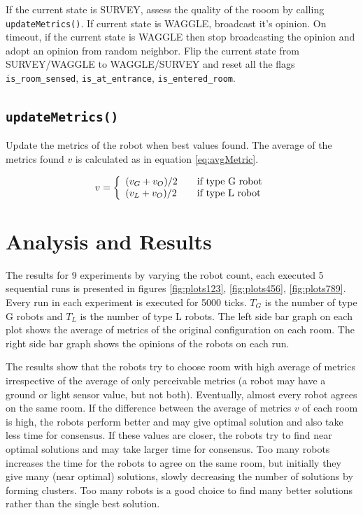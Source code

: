 \documentclass{llncs}
\begin{document}
	If the current state is SURVEY, assess the quality of the rooom by calling \texttt{updateMetrics()}. If current state is WAGGLE, broadcast it's opinion. On timeout, if the current state is WAGGLE then stop broadcasting the opinion and adopt an opinion from random neighbor. Flip the current state from SURVEY/WAGGLE to WAGGLE/SURVEY and reset all the flags \texttt{is\_room\_sensed}, \texttt{is\_at\_entrance}, \texttt{is\_entered\_room}.
	
	\subsection*{\texttt{updateMetrics()}}
	Update the metrics of the robot when best values found. The average of the metrics found $v$ is calculated as in equation \eqref{eq:avgMetric}.
	

	\begin{equation}
		\centering
		v = \left\{
		\begin{array}{l l}
		(v_G + v_O) / 2 & \quad \text{if type G robot}\\
		(v_L + v_O) / 2 & \quad \text{if type L robot}
		\end{array} \right.
		\label{eq:avgMetric}
	\end{equation}
	
	\section{Analysis and Results}\label{sec:comparision}
	The results for 9 experiments by varying the robot count, each executed 5 sequential runs is presented in figures \ref{fig:plots123}, \ref{fig:plots456}, \ref{fig:plots789}. Every run in each experiment is executed for 5000 ticks. $T_G$ is the number of type G robots and $T_L$ is the number of type L robots. The left side bar graph on each plot shows the average of metrics of the original configuration on each room. The right side bar graph shows the opinions of the robots on each run.
	
	The results show that the robots try to choose room with high average of metrics irrespective of the average of only perceivable metrics (a robot may have a ground or light sensor value, but not both). Eventually, almost every robot agrees on the same room. If the difference between the average of metrics $v$ of each room is high, the robots perform better and may give optimal solution and also take less time for consensus. If these values are closer, the robots try to find near optimal solutions and may take larger time for consensus. Too many robots increases the time for the robots to agree on the same room, but initially they give many (near optimal) solutions, slowly decreasing the number of solutions by forming clusters. Too many robots is a good choice to find many better solutions rather than the single best solution.
	
\end{document}
